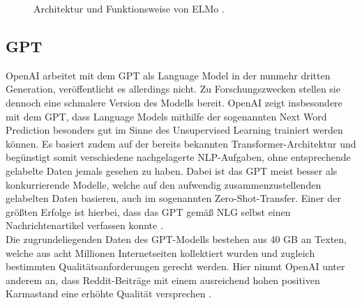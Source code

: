 \begin{figure}[h!]
  \centering
  \caption{Architektur und Funktionsweise von ELMo \cite{IRE18}.}
  \label{pic:ElmoStructure}
\end{figure}


\subsection{GPT}
\noindent
OpenAI arbeitet mit dem \ac{GPT} als Language Model in der nunmehr dritten Generation, veröffentlicht es allerdings nicht. Zu Forschungszwecken stellen sie dennoch eine schmalere Version des Modells bereit. OpenAI zeigt insbesondere mit dem \ac{GPT}, dass Language Models mithilfe der sogenannten Next Word Prediction besonders gut im Sinne des Unsupervised Learning trainiert werden können. Es basiert zudem auf der bereits bekannten Transformer-Architektur und begünstigt somit verschiedene nachgelagerte \ac{NLP}-Aufgaben, ohne entsprechende gelabelte Daten jemals gesehen zu haben. Dabei ist das \ac{GPT} meist besser als konkurrierende Modelle, welche auf den aufwendig zusammenzustellenden gelabelten Daten basieren, auch im sogenannten Zero-Shot-Transfer. Einer der größten Erfolge ist hierbei, dass das \ac{GPT} gemäß \ac{NLG} selbst einen Nachrichtenartikel verfassen konnte \cite[S.~1]{RAD19}.\\

\noindent
Die zugrundeliegenden Daten des \ac{GPT}-Modells bestehen aus 40 GB an Texten, welche aus acht Millionen Internetseiten kollektiert wurden und zugleich bestimmten Qualitätsanforderungen gerecht werden. Hier nimmt OpenAI unter anderem an, dass Reddit-Beiträge mit einem ausreichend hohen positiven Karmastand eine erhöhte Qualität versprechen \cite[S.~3]{RAD19}.\\

